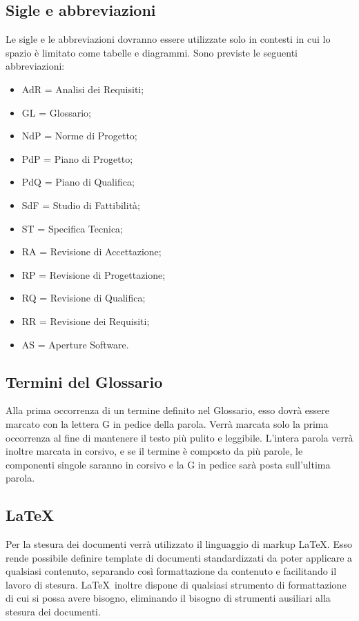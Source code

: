 \subsection{Sigle e abbreviazioni}
\label{5.5}
Le sigle e le abbreviazioni dovranno essere utilizzate solo in contesti in cui lo spazio è limitato come tabelle e diagrammi. Sono previste le seguenti abbreviazioni:
\begin{itemize}
\item AdR = Analisi dei Requisiti;
\item GL = Glossario;
\item NdP = Norme di Progetto;
\item PdP = Piano di Progetto;
\item PdQ = Piano di Qualifica;
\item SdF = Studio di Fattibilità;
\item ST = Specifica Tecnica;
\item RA = Revisione di Accettazione;
\item RP = Revisione di Progettazione;
\item RQ = Revisione di Qualifica;
\item RR = Revisione dei Requisiti;
\item AS = Aperture Software.
\end{itemize}

\subsection{Termini del Glossario}
\label{5.6}
Alla prima occorrenza di un termine definito nel Glossario, esso dovrà essere marcato con la lettera G in pedice della parola. Verrà marcata solo la prima occorrenza al fine di mantenere il testo più pulito e leggibile. L'intera parola verrà inoltre marcata in corsivo, e se il termine è composto da più parole, le componenti singole saranno in corsivo e la G in pedice sarà posta sull'ultima parola. 

\subsection{LaTeX}
\label{5.7}
Per la stesura dei documenti verrà utilizzato il linguaggio di markup \LaTeX. Esso rende possibile definire template di documenti standardizzati da poter applicare a qualsiasi contenuto, separando così formattazione da contenuto e facilitando il lavoro di stesura. \LaTeX\ inoltre dispone di qualsiasi strumento di formattazione di cui si possa avere bisogno, eliminando il bisogno di strumenti ausiliari alla stesura dei documenti.

